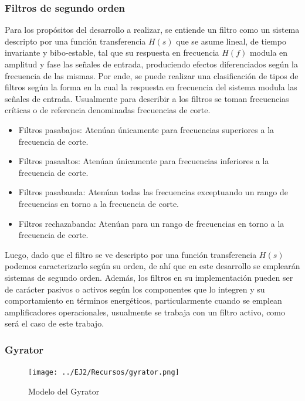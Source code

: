 \subsubsection{Filtros de segundo orden}
Para los prop\'ositos del desarrollo a realizar, se entiende un filtro como un sistema descripto por una funci\'on transferencia $H(s)$ que se asume lineal, de tiempo invariante
y bibo-estable, tal que su respuesta en frecuencia $H(f)$ modula en amplitud y fase las se\~nales de entrada, produciendo efectos diferenciados seg\'un la frecuencia de las mismas. Por ende,
se puede realizar una clasificaci\'on de tipos de filtros seg\'un la forma en la cual la respuesta en frecuencia del sistema modula las se\~nales de entrada. Usualmente para describir a los filtros se toman
frecuencias cr\'iticas o de referencia denominadas frecuencias de corte.

\begin{itemize}
    \item Filtros pasabajos: Aten\'uan \'unicamente para frecuencias superiores a la frecuencia de corte.
    \item Filtros pasaaltos: Aten\'uan \'unicamente para frecuencias inferiores a la frecuencia de corte.
    \item Filtros pasabanda: Aten\'uan todas las frecuencias exceptuando un rango de frecuencias en torno a la frecuencia de corte.
    \item Filtros rechazabanda: Aten\'uan para un rango de frecuencias en torno a la frecuencia de corte.
\end{itemize}

Luego, dado que el filtro se ve descripto por una funci\'on transferencia $H(s)$ podemos caracterizarlo seg\'un su orden, de ah\'i que en este desarrollo se emplear\'an sistemas de segundo orden.
Adem\'as, los filtros en su implementaci\'on pueden ser de car\'acter pasivos o activos seg\'un los componentes que lo integren y su comportamiento en t\'erminos energ\'eticos, particularmente cuando se emplean
amplificadores operacionales, usualmente se trabaja con un filtro activo, como ser\'a el caso de este trabajo.

\subsubsection{Gyrator}

\begin{figure}[H]
    \centering
    \texttt{[image: ../EJ2/Recursos/gyrator.png]}
    \caption{Modelo del Gyrator}
    \label{fig:gyrator_modelo}
\end{figure}

